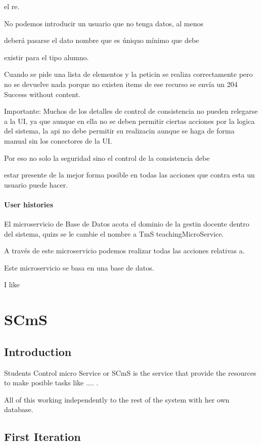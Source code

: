 \documentclass[oneside,english,titlepage]{scrbook}
\begin{document}
el re.

No podemos introducir un usuario que no tenga datos, al menos

deberá pasarse el dato nombre que es úniquo mínimo que debe

existir para el tipo alumno.

Cuando se pide una lista de elementos y la peticin se realiza correctamente
pero no se devuelve nada porque no existen items de ese recurso se
envía un 204 Success without content.

Importante: Muchos de los detalles de control de consistencia no pueden
relegarse a la UI, ya que aunque en ella no se deben permitir ciertas
acciones por la logica del sistema, la api no debe permitir su realizacin
aunque se haga de forma manual sin los conectores de la UI.

Por eso no solo la seguridad sino el control de la consistencia debe

estar presente de la mejor forma posible en todas las acciones que
contra esta un usuario puede hacer.

\paragraph{User histories}

El microservicio de Base de Datos acota el dominio de la gestin docente
dentro del sistema, quizs se le cambie el nombre a TmS teachingMicroService.

A través de este microservicio podemos realizar todas las acciones
relativas a.

Este microservicio se basa en una base de datos.

I like

\section{SCmS}

\subsection{Introduction}

Students Control micro Service or SCmS is the service that provide
the resources to make posible tasks like .... .

All of this working independently to the rest of the system with her
own database.

\subsection{First Iteration}
\end{document}
